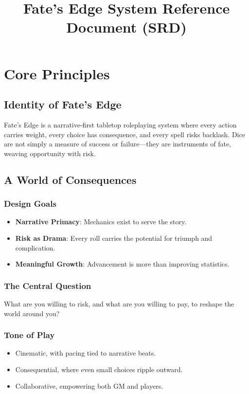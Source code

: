 \documentclass[11pt]{article}
\title{Fate's Edge System Reference Document (SRD)}
\author{}
\date{}
\begin{document}
\maketitle

\tableofcontents
\newpage

\section{Core Principles}

\subsection{Identity of Fate's Edge}
Fate's Edge is a narrative-first tabletop roleplaying system where every action carries weight, every choice has consequence, and every spell risks backlash. Dice are not simply a measure of success or failure—they are instruments of fate, weaving opportunity with risk.

\subsection{A World of Consequences}

\subsubsection{Design Goals}
\begin{itemize}
    \item \textbf{Narrative Primacy}: Mechanics exist to serve the story.
    \item \textbf{Risk as Drama}: Every roll carries the potential for triumph and complication.
    \item \textbf{Meaningful Growth}: Advancement is more than improving statistics.
\end{itemize}

\subsubsection{The Central Question}
What are you willing to risk, and what are you willing to pay, to reshape the world around you?

\subsubsection{Tone of Play}
\begin{itemize}
    \item Cinematic, with pacing tied to narrative beats.
    \item Consequential, where even small choices ripple outward.
    \item Collaborative, empowering both GM and players.
\end{itemize}
\end{document}

